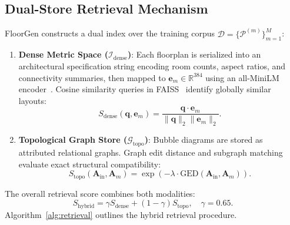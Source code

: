 \documentclass[journal]{IEEEtran}
\begin{document}
\subsection{Dual-Store Retrieval Mechanism}
FloorGen constructs a dual index over the training corpus $\mathcal{D} = \{\mathcal{P}^{(m)}\}_{m=1}^M$:
\begin{enumerate}
    \item \textbf{Dense Metric Space ($\mathcal{I}_{\mathrm{dense}}$)}: Each floorplan is serialized into an architectural specification string encoding room counts, aspect ratios, and connectivity summaries, then mapped to $\mathbf{e}_m \in \mathbb{R}^{384}$ using an all-MiniLM encoder~\cite{vaswani2017attention}. Cosine similarity queries in FAISS~\cite{johnson2019billion} identify globally similar layouts:
    \begin{equation}
    S_{\mathrm{dense}}(\mathbf{q}, \mathbf{e}_m) = \frac{\mathbf{q} \cdot \mathbf{e}_m}{\|\mathbf{q}\|_2 \|\mathbf{e}_m\|_2}.
    \end{equation}
    \item \textbf{Topological Graph Store ($\mathcal{G}_{\mathrm{topo}}$)}: Bubble diagrams are stored as attributed relational graphs. Graph edit distance and subgraph matching evaluate exact structural compatibility:
    \begin{equation}
    S_{\mathrm{topo}}(\mathbf{A}_{\mathrm{in}}, \mathbf{A}_m) = \exp\left(-\lambda \cdot \mathrm{GED}(\mathbf{A}_{\mathrm{in}}, \mathbf{A}_m)\right).
    \end{equation}
\end{enumerate}

The overall retrieval score combines both modalities:
\begin{equation}
S_{\mathrm{hybrid}} = \gamma S_{\mathrm{dense}} + (1 - \gamma) S_{\mathrm{topo}}, \quad \gamma = 0.65.
\end{equation}
Algorithm~\ref{alg:retrieval} outlines the hybrid retrieval procedure.
\end{document}
